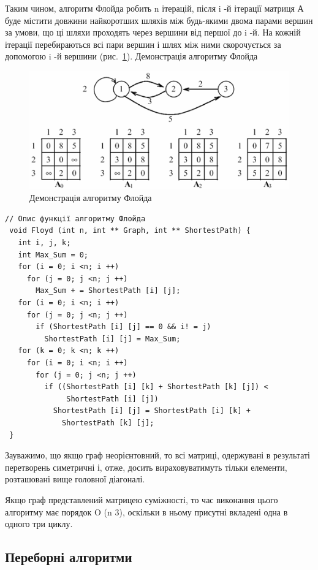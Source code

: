 Таким чином, алгоритм Флойда робить n ітерацій, після i -й ітерації матриця А буде містити довжини найкоротших шляхів між будь-якими двома парами вершин за умови, що ці шляхи проходять через вершини від першої до i -й. На кожній ітерації перебираються всі пари вершин і шлях між ними скорочується за допомогою i -й вершини (рис.~\ref{pic:45.2}).
Демонстрація алгоритму Флойда
\begin{figure}
\caption{Демонстрація алгоритму Флойда}\label{pic:45.2}
\includegraphics[width=13cm]{pic/45_02.png}

\end{figure}

\begin{lstlisting}[label=code:fl,caption=Опис функції алгоритму Флойда]
  // Опис функції алгоритму Флойда
 void Floyd (int n, int ** Graph, int ** ShortestPath) {
   int i, j, k;
   int Max_Sum = 0;
   for (i = 0; i <n; i ++)
     for (j = 0; j <n; j ++)
       Max_Sum + = ShortestPath [i] [j];
   for (i = 0; i <n; i ++)
     for (j = 0; j <n; j ++)
       if (ShortestPath [i] [j] == 0 && i! = j) 
         ShortestPath [i] [j] = Max_Sum;
   for (k = 0; k <n; k ++)
     for (i = 0; i <n; i ++)
       for (j = 0; j <n; j ++)
         if ((ShortestPath [i] [k] + ShortestPath [k] [j]) < 
              ShortestPath [i] [j])
           ShortestPath [i] [j] = ShortestPath [i] [k] + 
             ShortestPath [k] [j];
 } 
\end{lstlisting}
Зауважимо, що якщо граф неорієнтовний, то всі матриці, одержувані в результаті перетворень симетричні і, отже, досить вираховуватимуть тільки елементи, розташовані вище головної діагоналі.

Якщо граф представлений матрицею суміжності, то час виконання цього алгоритму має порядок O (n 3), оскільки в ньому присутні вкладені одна в одного три циклу. 


\subsection{Переборні алгоритми}

